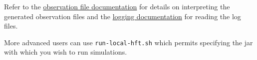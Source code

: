 \documentclass[11pt]{article}
\begin{document}
Refer to the \href{../observations.pdf}{observation file documentation} for details on interpreting the generated observation files and the \href{../logging.pdf}{logging documentation} for reading the log files.

More advanced users can use \verb|run-local-hft.sh| which permits specifying the jar with which you wish to run simulations.
\end{document}
